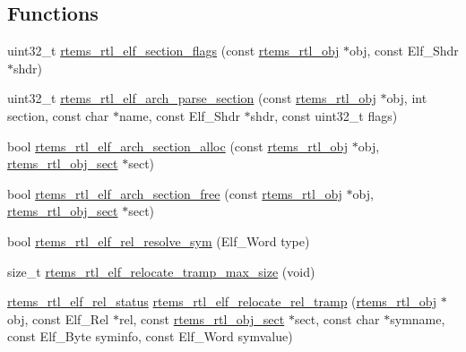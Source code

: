 \subsection*{Functions}
\begin{DoxyCompactItemize}
\item 
uint32\+\_\+t \mbox{\hyperlink{rtl-elf_8h_a3938c960beee26f9c02da2b3306331be}{rtems\+\_\+rtl\+\_\+elf\+\_\+section\+\_\+flags}} (const \mbox{\hyperlink{structrtems__rtl__obj}{rtems\+\_\+rtl\+\_\+obj}} $\ast$obj, const Elf\+\_\+\+Shdr $\ast$shdr)
\item 
uint32\+\_\+t \mbox{\hyperlink{rtl-elf_8h_aa6a3910dc1c57de45b61afb7596b1465}{rtems\+\_\+rtl\+\_\+elf\+\_\+arch\+\_\+parse\+\_\+section}} (const \mbox{\hyperlink{structrtems__rtl__obj}{rtems\+\_\+rtl\+\_\+obj}} $\ast$obj, int section, const char $\ast$name, const Elf\+\_\+\+Shdr $\ast$shdr, const uint32\+\_\+t flags)
\item 
bool \mbox{\hyperlink{rtl-elf_8h_a4f457c584ef6226919f3ce5304d6ca09}{rtems\+\_\+rtl\+\_\+elf\+\_\+arch\+\_\+section\+\_\+alloc}} (const \mbox{\hyperlink{structrtems__rtl__obj}{rtems\+\_\+rtl\+\_\+obj}} $\ast$obj, \mbox{\hyperlink{structrtems__rtl__obj__sect}{rtems\+\_\+rtl\+\_\+obj\+\_\+sect}} $\ast$sect)
\item 
bool \mbox{\hyperlink{rtl-elf_8h_a70765f950c9aee6530fbd51d6627d115}{rtems\+\_\+rtl\+\_\+elf\+\_\+arch\+\_\+section\+\_\+free}} (const \mbox{\hyperlink{structrtems__rtl__obj}{rtems\+\_\+rtl\+\_\+obj}} $\ast$obj, \mbox{\hyperlink{structrtems__rtl__obj__sect}{rtems\+\_\+rtl\+\_\+obj\+\_\+sect}} $\ast$sect)
\item 
bool \mbox{\hyperlink{rtl-elf_8h_a1a9e25c297593836ad3849c98d5727f8}{rtems\+\_\+rtl\+\_\+elf\+\_\+rel\+\_\+resolve\+\_\+sym}} (Elf\+\_\+\+Word type)
\item 
size\+\_\+t \mbox{\hyperlink{rtl-elf_8h_a3e52dface0970accc419bd34c34c1590}{rtems\+\_\+rtl\+\_\+elf\+\_\+relocate\+\_\+tramp\+\_\+max\+\_\+size}} (void)
\item 
\mbox{\hyperlink{rtl-elf_8h_a97d7ca039fc1123f4ca0c7b43d4a811f}{rtems\+\_\+rtl\+\_\+elf\+\_\+rel\+\_\+status}} \mbox{\hyperlink{rtl-elf_8h_a8b43075b39ed6b3d8fe19ee48392b041}{rtems\+\_\+rtl\+\_\+elf\+\_\+relocate\+\_\+rel\+\_\+tramp}} (\mbox{\hyperlink{structrtems__rtl__obj}{rtems\+\_\+rtl\+\_\+obj}} $\ast$obj, const Elf\+\_\+\+Rel $\ast$rel, const \mbox{\hyperlink{structrtems__rtl__obj__sect}{rtems\+\_\+rtl\+\_\+obj\+\_\+sect}} $\ast$sect, const char $\ast$symname, const Elf\+\_\+\+Byte syminfo, const Elf\+\_\+\+Word symvalue)
\item 

\end{DoxyCompactItemize}

